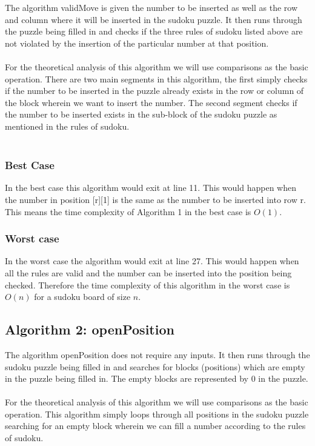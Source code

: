 \documentclass[12pt,a4paper,titlepage]{article}
\begin{document}
The algorithm validMove is given the number to be inserted as well as the row and column where it will be inserted in the sudoku puzzle. It then runs through the puzzle being filled in and checks if the three rules of sudoku listed above are not violated by the insertion of the particular number at that position.
\\
\\
For the theoretical analysis of this algorithm we will use comparisons as the basic operation. There are two main segments in this algorithm, the first simply checks if  the number to be inserted in the puzzle already exists in the row or column of the block wherein we want to insert the number. The second segment checks if the number to be inserted exists in the sub-block of the sudoku puzzle as mentioned in the rules of sudoku.
\\
\\

\subsubsection{Best Case}

In the best case this algorithm would exit at line 11. This would happen when the number in position [r][1] is the same as the number to be inserted into row r. This means the time complexity of Algorithm 1 in the best case is $O(1)$.

\subsubsection{Worst case}

In the worst case the algorithm would exit at line 27. This would happen when all the rules are valid and the number can be inserted into the position being checked. Therefore the time complexity of this algorithm in the worst case is $O(n)$ for a sudoku board of size $n$.

\subsection{Algorithm 2: openPosition}

The algorithm openPosition does not require any inputs. It then runs through the sudoku puzzle being filled in and searches for blocks (positions) which are empty in the puzzle being filled in. The empty blocks are represented by 0 in the puzzle.
\\
\\
For the theoretical analysis of this algorithm we will use comparisons as the basic operation. This algorithm simply loops through all positions in the sudoku puzzle searching for an empty block wherein we can fill a number according to the rules of sudoku. 
\end{document}
